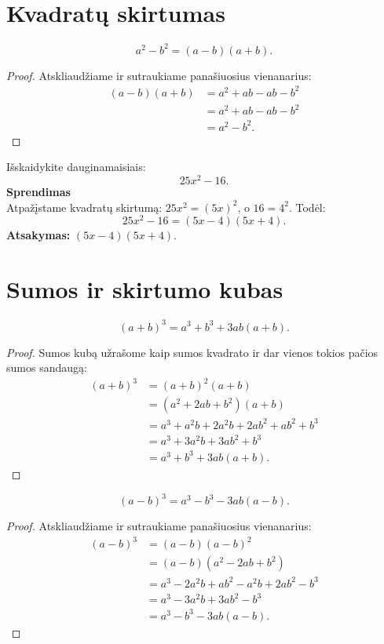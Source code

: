 \documentclass[11pt,a4paper]{scrartcl}
\begin{document}
\section{Kvadratų skirtumas}

\begin{property}
\[
a^2-b^2=(a-b)(a+b).
\]
\end{property}

\begin{proof}
 Atskliaudžiame ir sutraukiame panašiuosius vienanarius:
\[
\begin{aligned}
(a-b)(a+b)&=a^2+ab-ab-b^2\\
&=a^2+ab-ab-b^2\\
&=a^2-b^2.
\end{aligned}
\]
\end{proof}

\begin{example}
Išskaidykite dauginamaisiais:
\[
25x^2-16.
\]
\textbf{Sprendimas}\\
Atpažįstame kvadratų skirtumą: $25x^2=(5x)^2$, o $16=4^2$. Todėl:
\[
25x^2-16=(5x-4)(5x+4).
\]
\textbf{Atsakymas:} $(5x-4)(5x+4)$.
\end{example}

\section{Sumos ir skirtumo kubas}

\begin{property}
\[
(a+b)^3=a^3+b^3+3ab(a+b).
\]
\end{property}

\begin{proof}
Sumos kubą užrašome kaip sumos kvadrato ir dar vienos tokios pačios sumos sandaugą:
\[
\begin{aligned}
(a+b)^3&=(a+b)^2(a+b)\\
&=(a^2+2ab+b^2)(a+b)\\
&=a^3+a^2b+2a^2b+2ab^2+ab^2+b^3\\
&=a^3+3a^2b+3ab^2+b^3\\
&=a^3+b^3+3ab(a+b).
\end{aligned}
\]
\end{proof}

\begin{property}
\[
(a-b)^3=a^3-b^3-3ab(a-b).
\]
\end{property}

\begin{proof}
 Atskliaudžiame ir sutraukiame panašiuosius vienanarius:
\[
\begin{aligned}
(a-b)^3&=(a-b)(a-b)^2\\
&=(a-b)(a^2-2ab+b^2)\\
&=a^3-2a^2b+ab^2-a^2b+2ab^2-b^3\\
&=a^3-3a^2b+3ab^2-b^3\\
&=a^3-b^3-3ab(a-b).
\end{aligned}
\]
\end{proof}
\end{document}
